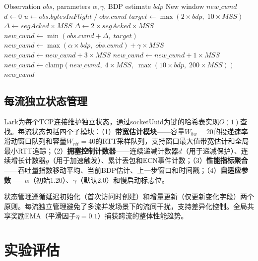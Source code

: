 \documentclass[10pt,twocolumn]{article}
\begin{document}
\begin{algorithm}[htbp]
\caption{Hybrid Rate-Window Fusion Control}
\label{alg:fusion}
\small
\begin{algorithmic}[1]
\REQUIRE Observation $obs$, parameters $\alpha, \gamma$, BDP estimate $bdp$
\ENSURE New window $new\_cwnd$
\STATE $d \leftarrow 0$ 
\STATE $u \leftarrow obs.bytesInFlight \;/\; obs.cwnd$
    \STATE $target \leftarrow \max(2 \times bdp, \; 10 \times MSS)$
    \STATE $\Delta \leftarrow segAcked \times MSS$
        \STATE $\Delta \leftarrow 2 \times segAcked \times MSS$
    \ENDIF
    \STATE $new\_cwnd \leftarrow \min(obs.cwnd + \Delta, \; target)$
\ELSE
    \STATE $new\_cwnd \leftarrow \max(\alpha \times bdp, \; obs.cwnd) + \gamma \times MSS$
\ENDIF
{}
    \STATE $new\_cwnd \leftarrow new\_cwnd + 3 \times MSS$
    \STATE $new\_cwnd \leftarrow new\_cwnd + 1 \times MSS$
\ENDIF
\STATE $new\_cwnd \leftarrow \text{clamp}(new\_cwnd, \; 4 \times MSS, \; \max(10 \times bdp, \; 200 \times MSS))$
\RETURN $new\_cwnd$
\end{algorithmic}
\end{algorithm}

\subsection{每流独立状态管理}

Lark为每个TCP连接维护独立状态，通过socketUuid为键的哈希表实现$O(1)$查找。每流状态包括四个子模块：（1）\textbf{带宽估计模块}——容量$W_{bw}=20$的投递速率滑动窗口队列和容量$W_{rtt}=40$的RTT采样队列，支持窗口最大值带宽估计和全局最小RTT追踪；（2）\textbf{拥塞控制计数器}——连续递减计数器$d$（用于递减保护）、连续增长计数器$g$（用于加速触发）、累计丢包和ECN事件计数；（3）\textbf{性能指标聚合}——吞吐量指数移动平均、当前BDP估计、上一步窗口和时间戳；（4）\textbf{自适应参数}——$\alpha$（初始1.20）、$\gamma$（默认2.0）和慢启动标志位。

状态管理遵循延迟初始化（首次访问时创建）和增量更新（仅更新变化字段）两个原则。每流独立管理避免了多流并发场景下的流间干扰，支持差异化控制。全局共享奖励EMA（平滑因子$\eta=0.1$）捕获跨流的整体性能趋势。


\section{实验评估}
\end{document}
